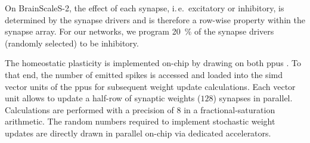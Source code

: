 On BrainScaleS-2, the effect of each synapse, i.\,e.\, excitatory or inhibitory, is determined by the synapse drivers and is therefore a row-wise property within the synapse array.
For our networks, we program \SI{20}{\percent} of the synapse drivers (randomly selected) to be inhibitory.

The homeostatic plasticity is implemented on-chip by drawing on both \glspl{ppu} \citep{friedmann_demonstrating_2017}.
To that end, the number of emitted spikes is accessed and loaded into the \gls{simd} vector units of the \glspl{ppu} for subsequent weight update calculations.
Each vector unit allows to update a half-row of synaptic weights ($128$) synapses in parallel.
Calculations are performed with a precision of \SI{8}{\bit} in a fractional-saturation arithmetic.
The random numbers required to implement stochastic weight updates are directly drawn in parallel on-chip via dedicated accelerators.

